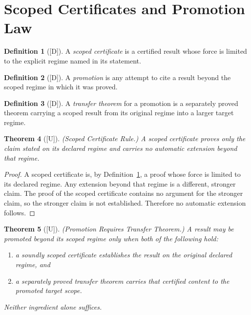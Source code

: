 \documentclass[12pt,oneside]{amsbook}
\theoremstyle{plain}
\newtheorem{theorem}{Theorem}[section]
\theoremstyle{definition}
\newtheorem{definition}[theorem]{Definition}
\theoremstyle{remark}
\newcommand{\status}[1]{\textup{[#1]}}
\begin{document}
\section{Scoped Certificates and Promotion Law}
\label{sec:promotion}

\begin{definition}[\status{D}]\label{def:scoped-cert}
A \emph{scoped certificate} is a certified result whose force is
limited to the explicit regime named in its statement.
\end{definition}

\begin{definition}[\status{D}]\label{def:promotion}
A \emph{promotion} is any attempt to cite a result beyond the scoped
regime in which it was proved.
\end{definition}

\begin{definition}[\status{D}]\label{def:transfer-theorem}
A \emph{transfer theorem} for a promotion is a separately proved
theorem carrying a scoped result from its original regime into a
larger target regime.
\end{definition}

\begin{theorem}[\status{U}]\label{thm:scoped-cert-rule}
\textup{(Scoped Certificate Rule.)}  A scoped certificate proves only
the claim stated on its declared regime and carries no automatic
extension beyond that regime.
\end{theorem}

\begin{proof}
A scoped certificate is, by Definition~\ref{def:scoped-cert}, a proof
whose force is limited to its declared regime.  Any extension beyond
that regime is a different, stronger claim.  The proof of the scoped
certificate contains no argument for the stronger claim, so the
stronger claim is not established.  Therefore no automatic extension
follows.
\end{proof}

\begin{theorem}[\status{U}]\label{thm:promotion-requires-transfer}
\textup{(Promotion Requires Transfer Theorem.)}  A result may be
promoted beyond its scoped regime only when both of the following hold:
\begin{enumerate}[label=\textup{(\arabic*)}]
  \item a soundly scoped certificate establishes the result on the
        original declared regime, and
  \item a separately proved transfer theorem carries that certified
        content to the promoted target scope.
\end{enumerate}
Neither ingredient alone suffices.
\end{theorem}
\end{document}
